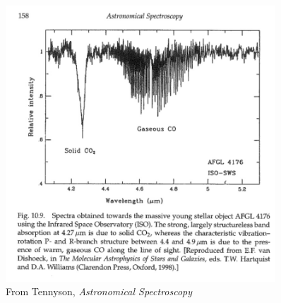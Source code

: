 \documentclass[11pt, preprint]{article}
\begin{document}
      \begin{figure}[h!]
        \includegraphics[width=0.9\textwidth]{tennyson-co-iso.jpeg}
        \caption{ \label{fig:co} From Tennyson, {\it Astronomical
            Spectroscopy} }
      \end{figure}
\end{document}

